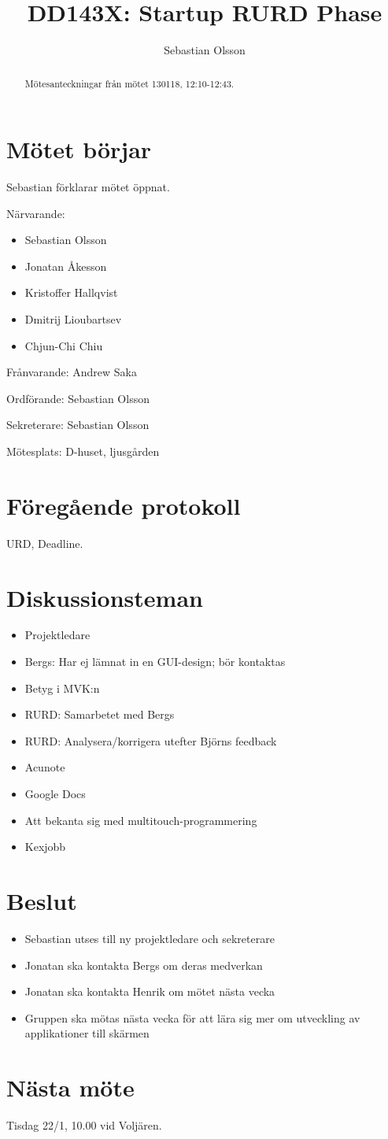 \documentclass[a4paper,12pt]{article}
\author{Sebastian Olsson}
\title{DD143X: Startup RURD Phase}
\begin{document}
\maketitle
\begin{abstract}
    Mötesanteckningar från mötet 130118, 12:10-12:43.
\end{abstract}

\section{Mötet börjar}
Sebastian förklarar mötet öppnat.

Närvarande:
\begin{itemize}
\item Sebastian Olsson
\item Jonatan Åkesson
\item Kristoffer Hallqvist
\item Dmitrij Lioubartsev
\item Chjun-Chi Chiu
\end{itemize}
Frånvarande: Andrew Saka

Ordförande: Sebastian Olsson

Sekreterare: Sebastian Olsson

Mötesplats: D-huset, ljusgården
\section{Föregående protokoll}
URD, Deadline.

\section{Diskussionsteman}
\begin{itemize}
\item Projektledare
\item Bergs: Har ej lämnat in en GUI-design; bör kontaktas
\item Betyg i MVK:n
\item RURD: Samarbetet med Bergs
\item RURD: Analysera/korrigera utefter Björns feedback
\item Acunote
\item Google Docs
\item Att bekanta sig med multitouch-programmering
\item Kexjobb
\end{itemize}

\section{Beslut}
\begin{itemize}
\item Sebastian utses till ny projektledare och sekreterare
\item Jonatan ska kontakta Bergs om deras medverkan
\item Jonatan ska kontakta Henrik om mötet nästa vecka
\item Gruppen ska mötas nästa vecka för att lära sig mer om utveckling av applikationer till
skärmen
\end{itemize}

\section{Nästa möte}
Tisdag 22/1, 10.00 vid Voljären.
\end{document}
